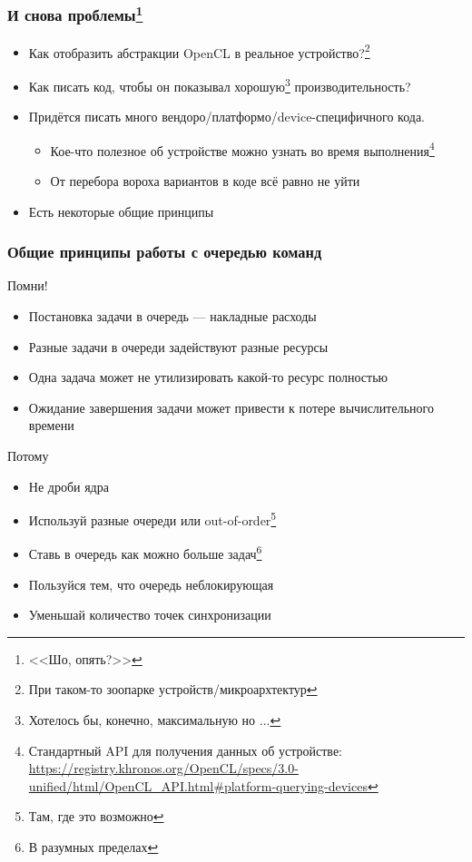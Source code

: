 \documentclass[xcolor=table,aspectratio=169]{beamer}
\begin{document}

\begin{frame}[fragile]
  \frametitle{И снова проблемы\footnote{<<Шо, опять?>>}}
  \begin{itemize}
    \item[\faQuestion] Как отобразить абстракции OpenCL в реальное устройство?\footnote{При таком-то зоопарке устройств/микроархтектур} 
    \item[\faQuestion] Как писать код, чтобы он показывал хорошую\footnote{Хотелось бы, конечно, максимальную но ...} производительность?    
  \end{itemize}
  \vfill
  \begin{itemize}
    \item[\faFrownO] Придётся писать много вендоро/платформо/device-специфичного кода.
    \begin{itemize} 
      \item[\faSmileO] Кое-что полезное об устройстве можно узнать во время выполнения\footnote{Стандартный API для получения данных об устройстве: \url{https://registry.khronos.org/OpenCL/specs/3.0-unified/html/OpenCL_API.html\#platform-querying-devices}}
      \item[\faMehO] От перебора вороха вариантов в коде всё равно не уйти 
    \end{itemize} 
    \item[\faExclamation] Есть некоторые общие принципы 
  \end{itemize}
\end{frame}

\begin{frame}[fragile]
  \frametitle{Общие принципы работы с очередью команд}
  Помни!
  \begin{itemize}
    \item Постановка задачи в очередь --- накладные расходы
    \item Разные задачи в очереди задействуют разные ресурсы
    \item Одна задача может не утилизировать какой-то ресурс полностью 
    \item Ожидание завершения задачи может привести к потере вычислительного времени
  \end{itemize}
  Потому
  \begin{itemize}
    \item Не дроби ядра
    \item Используй разные очереди или out-of-order\footnote{Там, где это возможно}
    \item Ставь в очередь как можно больше задач\footnote{В разумных пределах} 
    \item Пользуйся тем, что очередь неблокирующая
    \item Уменьшай количество точек синхронизации
  \end{itemize}
\end{frame}
\end{document}
